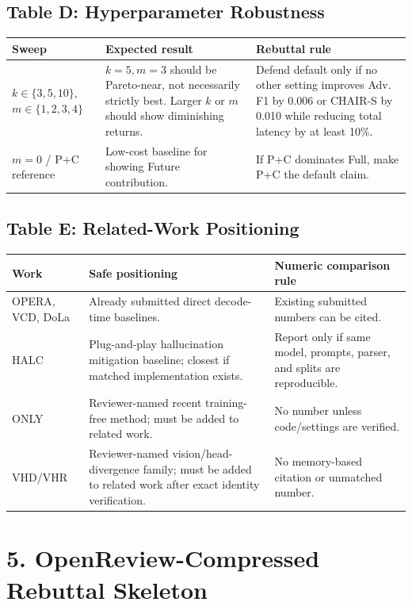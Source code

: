 \documentclass[10pt]{article}
\begin{document}
\subsection*{Table D: Hyperparameter Robustness}

\begin{tabularx}{\textwidth}{@{}p{}Y Y@{}}
\toprule
Sweep & Expected result & Rebuttal rule \\
\midrule
$k\in\{3,5,10\}$, $m\in\{1,2,3,4\}$ & $k=5,m=3$ should be Pareto-near, not necessarily strictly best. Larger $k$ or $m$ should show diminishing returns. & Defend default only if no other setting improves Adv. F1 by 0.006 or CHAIR-S by 0.010 while reducing total latency by at least 10\%. \\
$m=0$ / P+C reference & Low-cost baseline for showing Future contribution. & If P+C dominates Full, make P+C the default claim. \\
\bottomrule
\end{tabularx}

\subsection*{Table E: Related-Work Positioning}

\begin{tabularx}{\textwidth}{@{}p{}Y Y@{}}
\toprule
Work & Safe positioning & Numeric comparison rule \\
\midrule
OPERA, VCD, DoLa & Already submitted direct decode-time baselines. & Existing submitted numbers can be cited. \\
HALC & Plug-and-play hallucination mitigation baseline; closest if matched implementation exists. & Report only if same model, prompts, parser, and splits are reproducible. \\
ONLY & Reviewer-named recent training-free method; must be added to related work. & No number unless code/settings are verified. \\
VHD/VHR & Reviewer-named vision/head-divergence family; must be added to related work after exact identity verification. & No memory-based citation or unmatched number. \\
\bottomrule
\end{tabularx}

\section*{5. OpenReview-Compressed Rebuttal Skeleton}
\end{document}
